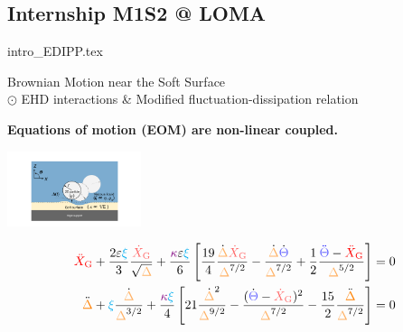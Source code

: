 \documentclass[9pt]{beamer}
\newcommand{\ssc}{\subsection}
\newcommand{\mrm}{\mathrm}
\newcommand{\tbf}{\textbf}
\newcommand{\agn}[1]{\begin{align} #1 \end{align}}
\newcommand{\veps}{\varepsilon}
\begin{document}
\ssc{Internship M1S2 @ LOMA}
{intro_EDIPP.tex}





\begin{frame}[noframenumbering]{Brownian Motion near the Soft Surface \\
\textcolor{ChimieBlue}{$\odot$ EHD interactions \& Modified fluctuation-dissipation relation}}


\tbf{Equations of motion (EOM) are non-linear coupled.}  
\ \\

\begin{minipage}{0.4\linewidth}
\begin{center}
\includegraphics[height=2.2cm]{figs/BEHD_JPS.pdf}
\end{center}
\end{minipage}
\begin{minipage}{0.55\linewidth}
\footnotesize
$$ \agn{
\textcolor{red}{\ddot{X}_\mrm{G}} + \frac{2\textcolor{black}{\veps} \textcolor{cyan}{\xi}}{3} \frac{\blendcolors*{!60}\textcolor{red}{\dot{X}_\mrm{G}}}{\sqrt{{\blendcolors*{!60}\textcolor{orange}{\Delta}}}} + \frac{\textcolor{violet}{\kappa} \textcolor{black}{\veps} \textcolor{cyan}{\xi}}{6} \left[ \frac{19}{4} \frac{\dot{\blendcolors*{!60}\textcolor{orange}{\Delta}} \blendcolors*{!60}\textcolor{red}{\dot{X}_\mrm{G}}}{{\blendcolors*{!60}\textcolor{orange}{\Delta}}^{7/2}} - \frac{\dot{\blendcolors*{!60}\textcolor{orange}{\Delta}} \dot{\blendcolors*{!60}\textcolor{blue}{\Theta}}}{{\blendcolors*{!60}\textcolor{orange}{\Delta}}^{7/2}} + \frac{1}{2} \frac{\textcolor{blue}{\ddot{\blendcolors*{!60}\textcolor{blue}{\Theta}}} - \textcolor{red}{\ddot{X}_\mrm{G}}}{{\blendcolors*{!60}\textcolor{orange}{\Delta}}^{5/2}} \right] &= 0 \\
\ddot{{\textcolor{orange}{\Delta}}} + \textcolor{cyan}{\xi} \frac{\dot{{\blendcolors*{!60}\textcolor{orange}{\Delta}}}}{{\blendcolors*{!60}\textcolor{orange}{\Delta}}^{3/2}} + \frac{\textcolor{violet}{\kappa} \textcolor{cyan}{\xi}}{4} \left[ 21 \frac{\dot{{\blendcolors*{!60}\textcolor{orange}{\Delta}}}^2}{{\blendcolors*{!60}\textcolor{orange}{\Delta}}^{9/2}} - \frac{(\dot{\blendcolors*{!60}\textcolor{blue}{\Theta}} - \blendcolors*{!60}\textcolor{red}{\dot{X}_\mrm{G}})^2}{{\blendcolors*{!60}\textcolor{orange}{\Delta}}^{7/2}} - \frac{15}{2} \frac{\ddot{{\textcolor{orange}{\Delta}}}}{{\blendcolors*{!60}\textcolor{orange}{\Delta}}^{7/2}} \right] &= 0 \\
}$$
\end{minipage}
\end{frame}
\end{document}
